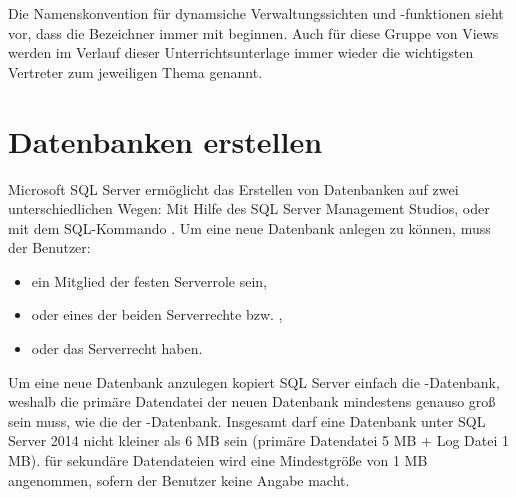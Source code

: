         Die Namenskonvention f\"ur dynamsiche Verwaltungssichten und -funktionen
        sieht vor, dass die Bezeichner immer mit 
        beginnen. Auch f\"ur diese Gruppe von Views werden im Verlauf dieser
        Unterrichtsunterlage immer wieder die wichtigsten Vertreter zum
        jeweiligen Thema genannt.
        
        \begin{literaturinternet}
          \item \cite{ms188754}
        \end{literaturinternet}
    \section{Datenbanken erstellen}
      Microsoft SQL Server ermöglicht das Erstellen von Datenbanken auf zwei
      unterschiedlichen Wegen: Mit Hilfe des SQL Server Management Studios,
      oder mit dem SQL-Kommando . Um eine neue
      Datenbank anlegen zu können, muss der Benutzer:
      \begin{itemize}
        \item ein Mitglied der festen Serverrole  sein,
        \item oder eines der beiden Serverrechte  bzw.
        ,
        \item oder das Serverrecht  haben. 
      \end{itemize}
      Um eine neue Datenbank anzulegen kopiert SQL Server einfach die
      -Datenbank, weshalb die primäre Datendatei der neuen
      Datenbank mindestens genauso groß sein muss, wie die der
      -Datenbank. Insgesamt darf eine Datenbank unter SQL
      Server 2014 nicht kleiner als 6 MB sein (primäre Datendatei 5 MB + Log
      Datei 1 MB). f\"ur sekundäre Datendateien wird eine Mindestgröße von 1 MB
      angenommen, sofern der Benutzer keine Angabe macht.
